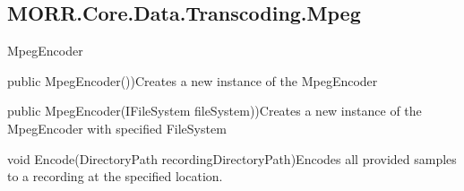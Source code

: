 \subsection*{MORR.Core.Data.Transcoding.Mpeg}

\begin{class}{MpegEncoder}



    \begin{attributes}
    \end{attributes}
    
     \begin{constructors}
		\begin{constructor}{public MpegEncoder())}{Creates a new instance of the MpegEncoder}
		\end{constructor}
		\begin{constructor}{public MpegEncoder(IFileSystem fileSystem))}{Creates a new instance of the MpegEncoder with specified FileSystem}
			\begin{parameters}
			\end{parameters}
		\end{constructor}
	\end{constructors}

    \begin{methods}
        \begin{method}{void Encode(DirectoryPath recordingDirectoryPath)}{Encodes all provided samples to a recording at the specified location.}
            \begin{parameters}
            \end{parameters}
            \begin{exceptions}
            \end{exceptions}
        \end{method}
    \end{methods}
\end{class}

